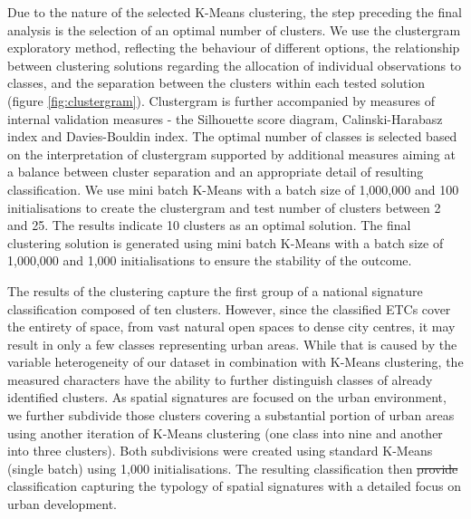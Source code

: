 \documentclass[fleqn,10pt]{wlscirep}
\providecommand{\DIFadd}[1]{{\protect\color{blue}\uwave{#1}}} %
\providecommand{\DIFdel}[1]{{\protect\color{red}\sout{#1}}}                      %
\providecommand{\DIFaddbegin}{} %
\providecommand{\DIFaddend}{} %
\providecommand{\DIFdelbegin}{} %
\providecommand{\DIFdelend}{} %
\begin{document}
Due to the nature of the selected K-Means clustering, the step preceding the final
analysis is the selection of an optimal number of clusters. We use the
clustergram exploratory method\cite{schonlau2002clustergram}, reflecting the behaviour of different options, the relationship
between clustering solutions regarding the allocation of individual observations to
classes, and the separation between the clusters within each tested solution (figure \ref{fig:clustergram}).
Clustergram is further accompanied by measures of internal validation measures - the
Silhouette score diagram, Calinski-Harabasz index\cite{calinski1974} and Davies-Bouldin index\cite{davies1979cluster}. The optimal
number of classes is selected based on the interpretation of clustergram supported by
additional measures aiming at a balance between cluster separation and an appropriate
detail of resulting classification. We use mini batch K-Means with a batch size of 1,000,000
and 100 initialisations to create the clustergram and test number of clusters between 2 and
25. The results indicate 10 clusters as an optimal solution. The final clustering solution
is generated using mini batch K-Means with a batch size of 1,000,000 and 1,000 initialisations
to ensure the stability of the outcome.

The results of the clustering capture the first group of a national signature
classification composed of ten clusters. However, since the classified ETCs
cover the entirety of space, from vast
natural open spaces to dense city centres, it may result in only a few classes
representing urban areas. While that is caused by the variable heterogeneity of our
dataset in combination with K-Means clustering, the measured characters have the ability
to further distinguish classes of already identified clusters. As spatial signatures
are focused on the urban environment, we further subdivide those clusters covering
a substantial portion of urban areas using another iteration of K-Means clustering
(one class into nine and another into three clusters). Both subdivisions were created using
standard K-Means (single batch) using 1,000 initialisations.
The resulting classification then \DIFdelbegin \DIFdel{provide }\DIFdelend \DIFaddbegin \DIFadd{provides }\DIFaddend classification capturing the typology of
spatial signatures with a detailed focus on urban development.
\end{document}
